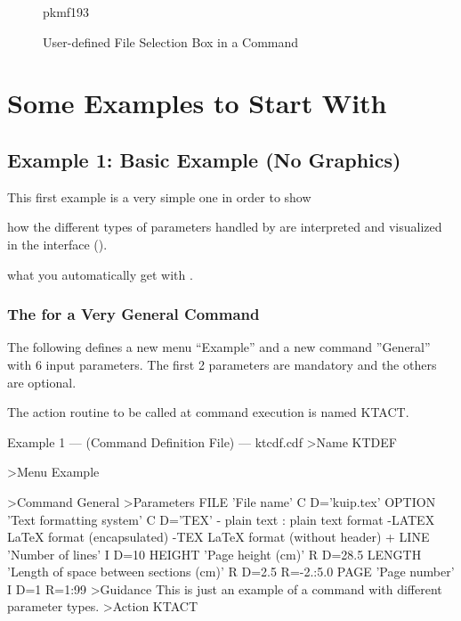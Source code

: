 \begin{figure}[htb]
\hfill
\begin{PICTf}[.4]{pkmf193}
\end{PICTf}
\hfill
\caption{User-defined File Selection Box in a Command}
\label{ref:FIGPKMF193}
\end{figure}
 
 
 
\section{Some Examples to Start With}

\subsection{Example 1: Basic Example (No Graphics)}
\label{ref:reexnogr}

This first example is a very simple one in order to show 
\begin{OL}
\item how the different types of parameters handled by \KUIP{} are interpreted 
and visualized in the \Motif{} interface (\CAP{}).
\item what you automatically get with \KUIPMotif{}.
\end{OL}

\subsubsection{The \CAP{} for a Very General Command}

The following \CDF{} defines a new menu ``Example'' and a new command
''General'' with 6 input parameters. The first 2 parameters are mandatory 
and the others are optional.

The action routine to be called at command execution is named KTACT.

\condbreak{3cm}
\begin{XMPt} {Example 1 --- \CDF{} (Command Definition File) ---
ktcdf.cdf}
>Name KTDEF

>Menu Example

>Command General
>Parameters
FILE 'File name' C D='kuip.tex'
OPTION 'Text formatting system' C D='TEX'
-      plain text : plain text format
-LATEX LaTeX format (encapsulated)
-TEX   LaTeX format (without header)
+
LINE 'Number of lines' I D=10
HEIGHT 'Page height (cm)' R D=28.5
LENGTH 'Length of space between sections (cm)' R D=2.5 R=-2.:5.0
PAGE  'Page number' I D=1 R=1:99
>Guidance
This is just an example of a command with different parameter
types.
>Action KTACT
\end{XMPt}

